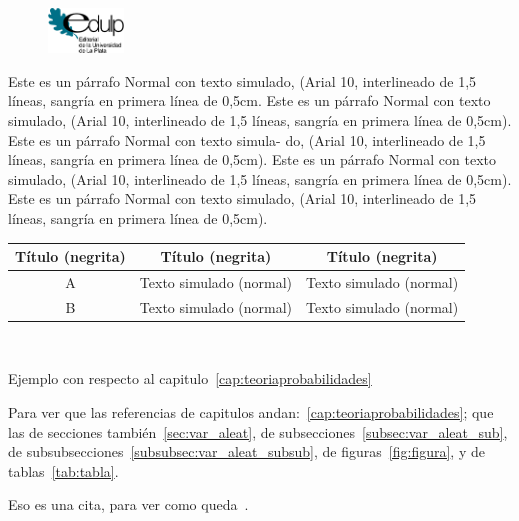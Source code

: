 \begin{figure}[h!]
\centerline{\includegraphics[width=2cm]{logo_large}}
%
\end{figure}

Este es un  p\'arrafo Normal con texto simulado, (Arial  10, interlineado de 1,5
l\'ineas, sangr\'ia en primera l\'inea de 0,5cm. Este es un p\'arrafo Normal con
texto simulado,  (Arial 10, interlineado  de 1,5 l\'ineas, sangr\'ia  en primera
l\'inea de 0,5cm). Este es un  p\'arrafo Normal con texto simula- do, (Arial 10,
interlineado de 1,5 l\'ineas, sangr\'ia en primera l\'inea de 0,5cm). Este es un
p\'arrafo Normal  con texto simulado,  (Arial 10, interlineado de  1,5 l\'ineas,
sangr\'ia en  primera l\'inea de 0,5cm).  Este es un p\'arrafo  Normal con texto
simulado, (Arial 10, interlineado de  1,5 l\'ineas, sangr\'ia en primera l\'inea
de 0,5cm).

\begin{table}
\begin{center}
\begin{tabular}{|c|c|c|}
\hline
{\bf T\'itulo (negrita)} & {\bf T\'itulo (negrita)} & {\bf T\'itulo (negrita)}\\
\hline
A & Texto simulado (normal) & Texto simulado (normal)\\
\hline
B & Texto simulado (normal) & Texto simulado (normal)\\
\hline
\end{tabular}
\end{center}\end{table}

\

Ejemplo con respecto al capitulo~\ref{cap:teoriaprobabilidades}

Para ver que las referencias de capitulos andan:~\ref{cap:teoriaprobabilidades};
que      las       de      secciones      tambi\'en~\ref{sec:var_aleat},      de
subsecciones~\ref{subsec:var_aleat_sub},                                       de
subsubsecciones~\ref{subsubsec:var_aleat_subsub}, de figuras~\ref{fig:figura}, y
de tablas~\ref{tab:tabla}.

Eso es una cita, para ver como queda~\cite{CovTho06, AmaNag00}.
